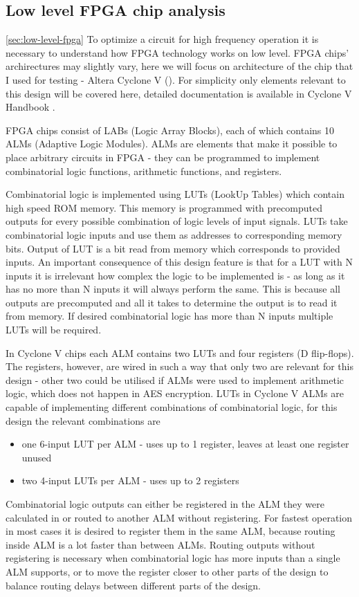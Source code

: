 \subsection{Low level FPGA chip analysis}
\ref{sec:low-level-fpga}
To optimize a circuit for high frequency operation it is necessary to understand how FPGA technology works on low level. FPGA chips' archirectures may slightly vary, here we will focus on architecture of the chip that I used for testing - Altera Cyclone V (\cite{handbook-vol1-chaprer1}). For simplicity only elements relevant to this design will be covered here, detailed documentation is available in Cyclone V Handbook \cite{handbook}.

FPGA chips consist of LABs (Logic Array Blocks), each of which contains 10 ALMs (Adaptive Logic Modules). ALMs are elements that make it possible to place arbitrary circuits in FPGA - they can be programmed to implement combinatorial logic functions, arithmetic functions, and registers.

Combinatorial logic is implemented using LUTs (LookUp Tables) which contain high speed ROM memory. This memory is programmed with precomputed outputs for every possible combination of logic levels of input signals. LUTs take combinatorial logic inputs and use them as addresses to corresponding memory bits. Output of LUT is a bit read from memory which corresponds to provided inputs. An important consequence of this design feature is that for a LUT with N inputs it is irrelevant how complex the logic to be implemented is - as long as it has no more than N inputs it will always perform the same. This is because all outputs are precomputed and all it takes to determine the output is to read it from memory. If desired combinatorial logic has more than N inputs multiple LUTs will be required.

In Cyclone V chips each ALM contains two LUTs and four registers (D flip-flops). The registers, however, are wired in such a way that only two are relevant for this design - other two could be utilised if ALMs were used to implement arithmetic logic, which does not happen in AES encryption. LUTs in Cyclone V ALMs are capable of implementing different combinations of combinatorial logic, for this design the relevant combinations are
\begin{itemize}
\item one 6-input LUT per ALM - uses up to 1 register, leaves at least one register unused
\item two 4-input LUTs per ALM - uses up to 2 registers
\end{itemize}
Combinatorial logic outputs can either be registered in the ALM they were calculated in or routed to another ALM without registering. For fastest operation in most cases it is desired to register them in the same ALM, because routing inside ALM is a lot faster than between ALMs. Routing outputs without registering is necessary when combinatorial logic has more inputs than a single ALM supports, or to move the register closer to other parts of the design to balance routing delays between different parts of the design.

